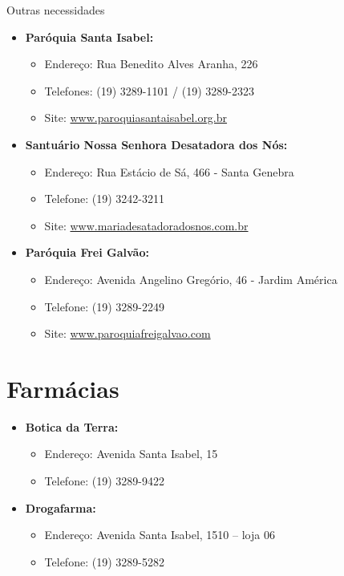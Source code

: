 \begin{story}{Outras necessidades}
\begin{itemize}
\item \textbf{Paróquia Santa Isabel:}
\begin{itemize}
\item Endereço: Rua Benedito Alves Aranha, 226
\item Telefones: (19) 3289-1101 / (19) 3289-2323
\item Site: \url{www.paroquiasantaisabel.org.br}
\end{itemize}

\item \textbf{Santuário Nossa Senhora Desatadora dos Nós:}
\begin{itemize}
\item Endereço: Rua Estácio de Sá, 466 - Santa Genebra
\item Telefone: (19) 3242-3211
\item Site: \url{www.mariadesatadoradosnos.com.br}
\end{itemize}

\item \textbf{Paróquia Frei Galvão:}
\begin{itemize}
\item Endereço: Avenida Angelino Gregório, 46 - Jardim América
\item Telefone: (19) 3289-2249
\item Site: \url{www.paroquiafreigalvao.com}
\end{itemize}

\end{itemize}

\section*{Farmácias}

\begin{itemize}

\item \textbf{Botica da Terra:}
\begin{itemize}
\item Endereço: Avenida Santa Isabel, 15
\item Telefone: (19) 3289-9422
\end{itemize}

\item \textbf{Drogafarma:}
\begin{itemize}
\item Endereço: Avenida Santa Isabel, 1510 -- loja 06
\item Telefone: (19) 3289-5282
\end{itemize}


\end{itemize}
\end{story}
